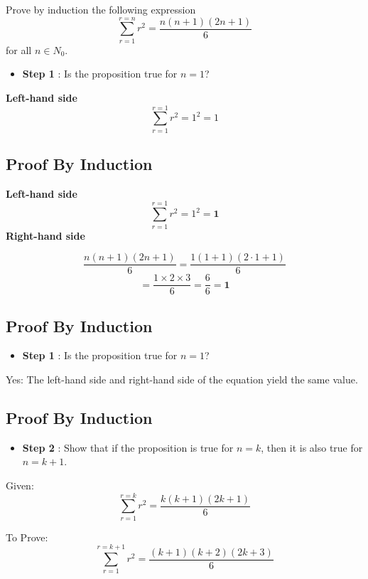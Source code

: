\documentclass[]{report}
\begin{document}
Prove by induction the following expression
\[ \sum_{r=1}^{r=n} r^2 = \frac{n(n+1)(2n+1)}{6} \]
for all $n \in N_0$.
\begin{itemize}
\item \textbf{Step 1} : Is the proposition true for $n = 1$? 
\end{itemize}
\textbf{Left-hand side}
\[ \sum_{r=1}^{r=1} r^2 = 1^2 = 1 \]




\subsection{Proof By Induction}

\textbf{Left-hand side}
\[ \sum_{r=1}^{r=1} r^2 = 1^2 = \boldsymbol{1} \]
\textbf{Right-hand side}

\[ \frac{n(n+1)(2n+1)}{6}  = \frac{1(1+1)(2\cdot 1+1)}{6} \]
\[  = \frac{1\times 2 \times 3}{6} = \frac{6}{6}=\boldsymbol{1} \]


\subsection{Proof By Induction}

\begin{itemize}
\item \textbf{Step 1} : Is the proposition true for $n = 1$? 
\end{itemize}
\bigskip
Yes: The left-hand side and right-hand side of the equation yield the same value.




\subsection{Proof By Induction}

\begin{itemize}
\item \textbf{Step 2} : Show that if the proposition is true for $n=k$, then it is also true for $n=k+1$.
\end{itemize}
Given: \[ \sum_{r=1}^{r=k} r^2 = \frac{k(k+1)(2k+1)}{6} \]

To Prove: \[ \sum_{r=1}^{r=k+1} r^2 = \frac{(k+1)(k+2)(2k+3)}{6} \]
\end{document}
